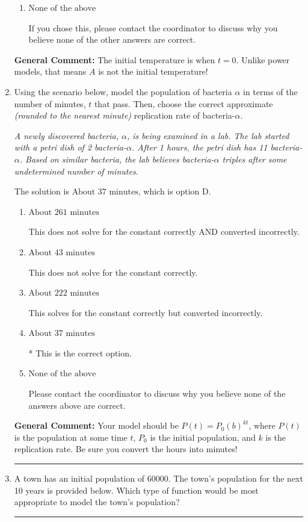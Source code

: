\documentclass{extbook}[14pt]
\newcommand{\litem}[1]{\item #1

\rule{\textwidth}{0.4pt}}
\begin{document}
\begin{enumerate}
{\begin{enumerate}[label=\Alph*.]
This uses $A$ as the initial temperature and solves for $k$ correctly.
\item \( \text{None of the above} \)

If you chose this, please contact the coordinator to discuss why you believe none of the other answers are correct.
\end{enumerate}

\textbf{General Comment:} The initial temperature is when $t = 0$. Unlike power models, that means $A$ is not the initial temperature!
}
\litem{
Using the scenario below, model the population of bacteria $\alpha$ in terms of the number of minutes, $t$ that pass. Then, choose the correct approximate \textit{(rounded to the nearest minute)} replication rate of bacteria-$\alpha$.

\begin{center}
    \textit{ A newly discovered bacteria, $\alpha$, is being examined in a lab. The lab started with a petri dish of 2 bacteria-$\alpha$. After 1 hours, the petri dish has 11 bacteria-$\alpha$. Based on similar bacteria, the lab believes bacteria-$\alpha$ triples after some undetermined number of minutes. }
\end{center}
The solution is \( \text{About } 37 \text{ minutes} \), which is option D.\begin{enumerate}[label=\Alph*.]
\item \( \text{About } 261 \text{ minutes} \)

This does not solve for the constant correctly AND converted incorrectly.
\item \( \text{About } 43 \text{ minutes} \)

This does not solve for the constant correctly.
\item \( \text{About } 222 \text{ minutes} \)

This solves for the constant correctly but converted incorrectly.
\item \( \text{About } 37 \text{ minutes} \)

* This is the correct option.
\item \( \text{None of the above} \)

Please contact the coordinator to discuss why you believe none of the answers above are correct.
\end{enumerate}

\textbf{General Comment:} Your model should be $P(t) = P_0(b)^{kt}$, where $P(t)$ is the population at some time $t$, $P_0$ is the initial population, and $k$ is the replication rate. Be sure you convert the hours into minutes!
}
\litem{
A town has an initial population of 60000. The town's population for the next 10 years is provided below. Which type of function would be most appropriate to model the town's population?


}
\end{enumerate}
\end{document}

